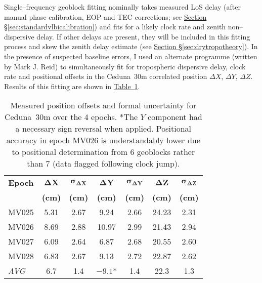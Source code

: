 				Single--frequency geoblock fitting nominally takes measured LoS delay (after manual phase calibration, EOP and TEC corrections; see \hyperref[sec:standardvlbicalibration]{Section \S\ref*{sec:standardvlbicalibration}}) and fits for a likely clock rate and zenith non--dispersive delay. If other delays are present, they will be included in this fitting process and skew the zenith delay estimate (see \hyperref[sec:drytropotheory]{Section \S\ref*{sec:drytropotheory}}). %
				In the presence of suspected baseline errors, I used an alternate programme (written by Mark J. Reid) to simultaneously fit for tropospheric dispersive delay, clock rate and positional offsets in the Ceduna~30m correlated position $\Delta X$, $\Delta Y$, $\Delta Z$. Results of this fitting are shown in \hyperref[tab:ceduna_offset]{Table~\ref*{tab:ceduna_offset}}.
				\begin{table}[h]
					\footnotesize
					\centering
					\caption[Ceduna position offsets]{Measured position offsets and formal uncertainty for Ceduna~30m over the 4 epochs. *The $Y$ component had a necessary sign reversal when applied. Positional accuracy in epoch MV026 is understandably lower due to positional determination from 6 geoblocks rather than 7 (data flagged following clock jump).}
					{\onehalfspacing
						\begin{tabular}{lcccccc} \hline
							\multicolumn{1}{c}{\bf Epoch} & \multicolumn{1}{c}{$\boldsymbol{\Delta X}$} & \multicolumn{1}{c}{$\boldsymbol{\sigma_{\Delta X}}$} & \multicolumn{1}{c}{$\boldsymbol{\Delta Y}$} &\multicolumn{1}{c}{$\boldsymbol{\sigma_{\Delta Y}}$} & \multicolumn{1}{c}{$\boldsymbol{\Delta Z}$} & \multicolumn{1}{c}{$\boldsymbol{\sigma_{\Delta Z}}$} \\
							& \multicolumn{1}{c}{\textbf{(cm)}} & \multicolumn{1}{c}{\textbf{(cm)}} & \multicolumn{1}{c}{\textbf{(cm)}} & \multicolumn{1}{c}{\textbf{(cm)}} & \multicolumn{1}{c}{\textbf{(cm)}} & \multicolumn{1}{c}{\textbf{(cm)}} \\\midrule
							MV025	&	5.31	&	2.67	&	9.24	&	2.66	&	24.23	&	2.31	\\
							MV026	&	8.69	&	2.88	&	10.97	&	2.99	&	21.43	&	2.94	\\
							MV027	&	6.09	&	2.64	&	6.87	&	2.68	&	20.55	&	2.60	\\
							MV028	&	6.83	&	2.67	&	9.13	&	2.72	&	22.87	&	2.62	\\\hline
							\textit{AVG}	&	6.7	&	1.4	&	$-9.1$*	&	1.4	&	22.3	&	1.3	\\
							\bottomrule
						\end{tabular}} \label{tab:ceduna_offset}
					\end{table}	
					
